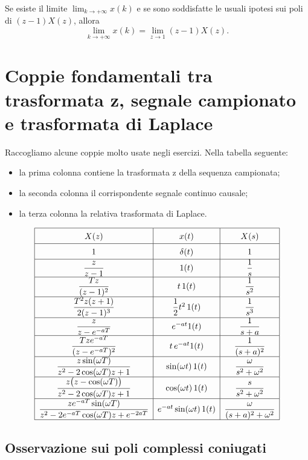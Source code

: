 Se esiste il limite \(\lim_{k\to+\infty}x(k)\) e se sono soddisfatte le usuali ipotesi
sui poli di \((z-1)X(z)\), allora
\[
\lim_{k\to+\infty}x(k)
=
\lim_{z\to 1}(z-1)X(z).
\]

\section{Coppie fondamentali tra trasformata z, segnale campionato e trasformata di Laplace}

Raccogliamo alcune coppie molto usate negli esercizi.
Nella tabella seguente:
\begin{itemize}
    \item la prima colonna contiene la trasformata z della sequenza campionata;
    \item la seconda colonna il corrispondente segnale continuo causale;
    \item la terza colonna la relativa trasformata di Laplace.
\end{itemize}

\[
\renewcommand{\arraystretch}{1.5}
\begin{array}{|c|c|c|}
\hline
X(z) & x(t) & X(s) \\
\hline
1 & \delta(t) & 1 \\
\hline
\dfrac{z}{z-1} & 1(t) & \dfrac{1}{s} \\
\hline
\dfrac{Tz}{(z-1)^2} & t\,1(t) & \dfrac{1}{s^2} \\
\hline
\dfrac{T^2 z(z+1)}{2(z-1)^3} & \dfrac{1}{2}t^2\,1(t) & \dfrac{1}{s^3} \\
\hline
\dfrac{z}{z-e^{-aT}} & e^{-at}1(t) & \dfrac{1}{s+a} \\
\hline
\dfrac{Tze^{-aT}}{(z-e^{-aT})^2} & t\,e^{-at}1(t) & \dfrac{1}{(s+a)^2} \\
\hline
\dfrac{z\sin(\omega T)}{z^2-2\cos(\omega T)z+1}
& \sin(\omega t)\,1(t)
& \dfrac{\omega}{s^2+\omega^2}
\\
\hline
\dfrac{z\bigl(z-\cos(\omega T)\bigr)}{z^2-2\cos(\omega T)z+1}
& \cos(\omega t)\,1(t)
& \dfrac{s}{s^2+\omega^2}
\\
\hline
\dfrac{ze^{-aT}\sin(\omega T)}
{z^2-2e^{-aT}\cos(\omega T)z+e^{-2aT}}
& e^{-at}\sin(\omega t)\,1(t)
& \dfrac{\omega}{(s+a)^2+\omega^2}
\\
\hline
\end{array}
\]

\subsection*{Osservazione sui poli complessi coniugati}

